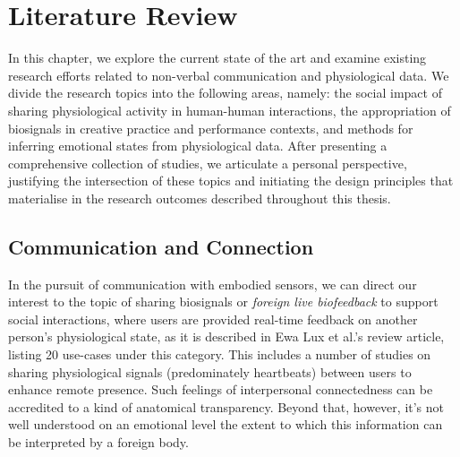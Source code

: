 

\chapter{Literature Review}
\label{cha:lit_review}

In this chapter, we explore the current state of the art and examine existing research efforts related to non-verbal communication and physiological data. We divide the research topics into the following areas, namely: the social impact of sharing physiological activity in human-human interactions, the appropriation of biosignals in creative practice and performance contexts, and methods for inferring emotional states from physiological data. After presenting a comprehensive collection of studies, we articulate a personal perspective, justifying the intersection of these topics and initiating the design principles that materialise in the research outcomes described throughout this thesis.

\section{Communication and Connection}
\label{lit_review:biosignals_sharing}

In the pursuit of communication with embodied sensors, we can direct our interest to the topic of sharing biosignals or \textit{foreign live biofeedback} to support social interactions, where users are provided real-time feedback on another person's physiological state, as it is described in Ewa Lux et al.'s \cite{lux_live_2018} review article, listing 20 use-cases under this category. This includes a number of studies on sharing physiological signals (predominately heartbeats) between users to enhance remote presence. Such feelings of interpersonal connectedness can be accredited to a kind of anatomical transparency. Beyond that, however, it's not well understood on an emotional level the extent to which this information can be interpreted by a foreign body.

